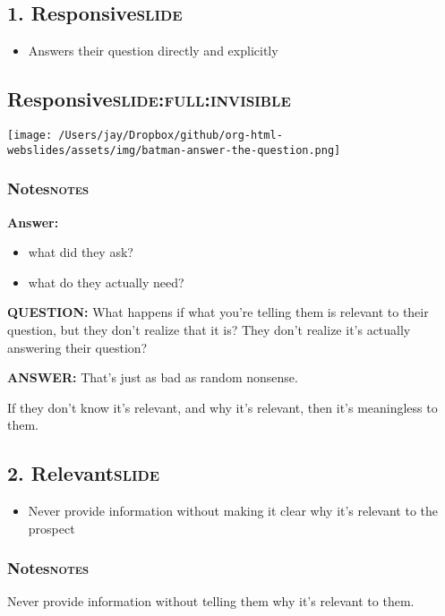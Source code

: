 \documentclass[12pt]{article}
\begin{document}
\subsection[1. Responsive]{1. Responsive\hfill{}\textsc{slide}}
\label{sec:orgde89c2c}
\begin{itemize}
\item Answers their question directly and explicitly
\end{itemize}

\subsection[Responsive]{Responsive\hfill{}\textsc{slide:full:invisible}}
\label{sec:org9e13d8b}
\begin{center}
\texttt{[image: /Users/jay/Dropbox/github/org-html-webslides/assets/img/batman-answer-the-question.png]}
\end{center}

\subsubsection[Notes]{Notes\hfill{}\textsc{notes}}
\label{sec:orgee45830}
\textbf{Answer:}
\begin{itemize}
\item what did they ask?
\item what do they actually need?
\end{itemize}

\textbf{QUESTION:} What happens if what you're telling them is relevant to their question, but they don't realize that it is? They don't realize it's actually answering their question?

\textbf{ANSWER:} That's just as bad as random nonsense.

If they don't know it's relevant, and why it's relevant, then it's meaningless to them.

\subsection[2. Relevant]{2. Relevant\hfill{}\textsc{slide}}
\label{sec:orgbcfbd17}
\begin{itemize}
\item Never provide information without making it clear why it's relevant to the prospect
\end{itemize}

\subsubsection[Notes]{Notes\hfill{}\textsc{notes}}
\label{sec:org99d5a20}
Never provide information without telling them why it's relevant to them.
\end{document}
